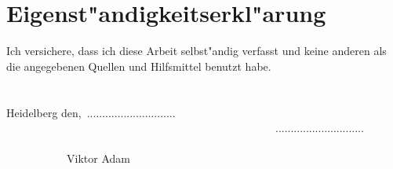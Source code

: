 

\thispagestyle{empty}

\section*{Eigenst"andigkeitserkl"arung}

Ich versichere, dass ich diese Arbeit selbst"andig verfasst und keine anderen als die angegebenen
Quellen und Hilfsmittel benutzt habe. \\ \\ \\

Heidelberg den,\ .............................     \ \ \ \ \ \ \ \ \ \ \ \ \ \ \ \ \ \ \ \ \ \ \ \ \ \ \ \ \ \ \ \ \ \ \ \ \ \ \ \ \ \ \ \ \ \ \ \ \ ............................. \\

\ \ \ \ \ \ \ \ \ \ \ \ \ \ \ \ \ \ \ \ \ \ \ \ \ \ \ \ \ \ \ \ \ \ \ \ \ \ \ \ \ \ \ \ \ \ \ \ \ \ \ \ \ \ \ \ \ \ \ \ \ \ \ \ \ \ \ \ \ \ \ \ \ \ \ \ \ \ \  \ \ \ \ Viktor Adam



\cleardoublepage
\thispagestyle{empty}
